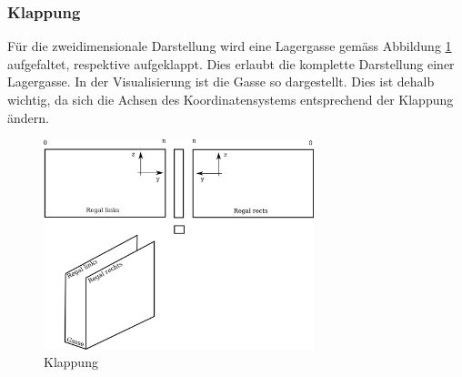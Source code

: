 \subsubsection{Klappung}
Für die zweidimensionale Darstellung wird eine Lagergasse gemäss Abbildung \ref{fig:klapp} aufgefaltet, respektive aufgeklappt. Dies erlaubt die komplette Darstellung einer Lagergasse. In der Visualisierung ist die Gasse so dargestellt. Dies ist dehalb wichtig, da sich die Achsen des Koordinatensystems entsprechend der Klappung ändern.  
%
\begin{figure}[H]
  \begin{center}
    \includegraphics[width=0.7\textwidth]{images/klappung.png}
    \caption{Klappung}
    \label{fig:klapp}
  \end{center}
\end{figure}

%
